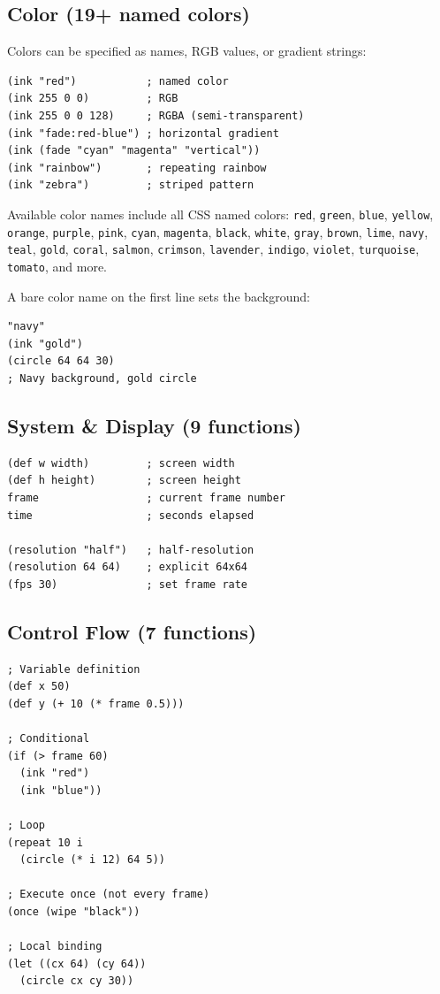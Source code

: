 \documentclass[10pt,letterpaper,twocolumn]{article}
\begin{document}
\subsection{Color (19+ named colors)}

Colors can be specified as names, RGB values, or gradient strings:

\begin{lstlisting}
(ink "red")           ; named color
(ink 255 0 0)         ; RGB
(ink 255 0 0 128)     ; RGBA (semi-transparent)
(ink "fade:red-blue") ; horizontal gradient
(ink (fade "cyan" "magenta" "vertical"))
(ink "rainbow")       ; repeating rainbow
(ink "zebra")         ; striped pattern
\end{lstlisting}

Available color names include all CSS named colors: \texttt{red}, \texttt{green}, \texttt{blue}, \texttt{yellow}, \texttt{orange}, \texttt{purple}, \texttt{pink}, \texttt{cyan}, \texttt{magenta}, \texttt{black}, \texttt{white}, \texttt{gray}, \texttt{brown}, \texttt{lime}, \texttt{navy}, \texttt{teal}, \texttt{gold}, \texttt{coral}, \texttt{salmon}, \texttt{crimson}, \texttt{lavender}, \texttt{indigo}, \texttt{violet}, \texttt{turquoise}, \texttt{tomato}, and more.

A bare color name on the first line sets the background:

\begin{lstlisting}
"navy"
(ink "gold")
(circle 64 64 30)
; Navy background, gold circle
\end{lstlisting}

\subsection{System \& Display (9 functions)}

\begin{lstlisting}
(def w width)         ; screen width
(def h height)        ; screen height
frame                 ; current frame number
time                  ; seconds elapsed

(resolution "half")   ; half-resolution
(resolution 64 64)    ; explicit 64x64
(fps 30)              ; set frame rate
\end{lstlisting}

\subsection{Control Flow (7 functions)}

\begin{lstlisting}
; Variable definition
(def x 50)
(def y (+ 10 (* frame 0.5)))

; Conditional
(if (> frame 60)
  (ink "red")
  (ink "blue"))

; Loop
(repeat 10 i
  (circle (* i 12) 64 5))

; Execute once (not every frame)
(once (wipe "black"))

; Local binding
(let ((cx 64) (cy 64))
  (circle cx cy 30))
\end{lstlisting}
\end{document}
